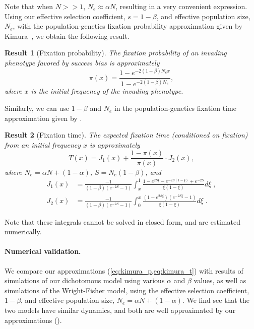 \documentclass[12pt]{extarticle}
\newtheorem{result}{Result}
\begin{document}
Note that when $N>>1$, $N_e \approx \alpha N$, resulting in a very convenient expression.\\

Using our effective selection coefficient, $s=1-\beta$, and effective population size, $N_e$, with the population-genetics fixation probability approximation given by Kimura~\citep[eq.~8]{kimura}, we obtain the following result.\\

\begin{result}[Fixation probability]
The fixation probability of an invading phenotype favored by success bias is approximately 
\begin{equation}\label{eq:kimura_p}
\pi(x) = \frac{1-e^{-2(1-\beta)N_e x}}{1-e^{-2(1-\beta)N_e}},
\end{equation}
where $x$ is the initial frequency of the invading phenotype.
\end{result}

Similarly, we can use $1-\beta$ and $N_e$ in the population-genetics fixation time approximation given by \citep[eq.~17]{kimura_average}.\\

\begin{result}[Fixation time] The expected fixation time (conditioned on fixation) from an initial frequency $x$ is approximately
\begin{equation} \label{eq:kimura_t}
T(x) = J_1(x) + \frac{1-\pi(x)}{\pi(x)}\cdot J_2(x),
\end{equation}
where $N_e=\alpha N + (1-\alpha)$, $S=N_e(1-\beta)$, and
\begin{equation}
\begin{aligned}
J_1(x) &= \frac{-1}{(1-\beta)(e^{-2S}-1)}\int_x^1 \frac{1-e^{2S\xi}-e^{-2S(1-\xi)}+e^{-2S}}{\xi(1-\xi)}d\xi \;, \\
J_2(x) &= \frac{-1}{(1-\beta)(e^{-2S}-1)}\int_0^x \frac{(1-e^{2S\xi})(e^{-2S\xi}-1)}{\xi(1-\xi)}d\xi \;.
\end{aligned}
\end{equation}
\end{result}
Note that these integrals cannot be solved in closed form, {and are estimated} numerically.

\paragraph{Numerical validation.}
We compare our approximations (\cref{eq:kimura_p,eq:kimura_t}) with results of simulations of our dichotomous model using various $\alpha$ and $\beta$ values, as well as simulations of the Wright-Fisher model, using the effective selection coefficient, $1-\beta$, and effective population size, $N_e=\alpha N + (1-\alpha)$. 
We find see that the two models have similar dynamics, and both are well approximated {by} our approximations ().
\end{document}
